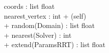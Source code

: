 {
	coords : list float\\
	nearest$\_$vertex : int
}
{
+ \dunder (self) \\
+ random(Domain) : list float \\
+ nearest(Solver) : int\\ %
+ extend(ParamsRRT) : list float \\%
}
